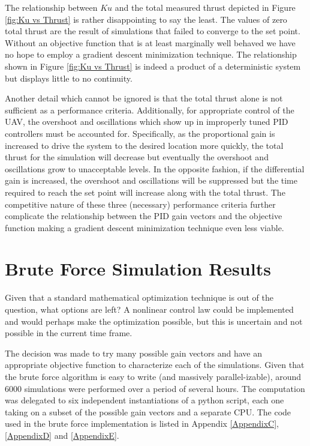 The relationship between $Ku$ and the total measured thrust depicted in Figure \ref{fig:Ku vs Thrust} is rather disappointing to say the least. The values of zero total thrust are the result of simulations that failed to converge to the set point. Without an objective function that is at least marginally well behaved we have no hope to employ a gradient descent minimization technique. The relationship shown in Figure \ref{fig:Ku vs Thrust} is indeed a product of a deterministic system but displays little to no continuity.

Another detail which cannot be ignored is that the total thrust alone is not sufficient as a performance criteria. Additionally, for appropriate control of the UAV,  the overshoot and oscillations which show up in improperly tuned PID controllers must be accounted for. Specifically, as the proportional gain is increased to drive the system to the desired location more quickly, the total thrust for the simulation will decrease but eventually the overshoot and oscillations grow to unacceptable levels. In the opposite fashion, if the differential gain is increased, the overshoot and oscillations will be suppressed but the time required to reach the set point will increase along with the total thrust. The competitive nature of these three (necessary) performance criteria further complicate the relationship between the PID gain vectors and the objective function making a gradient descent minimization technique even less viable.

\section{Brute Force Simulation Results}

Given that a standard mathematical optimization technique is out of the question, what options are left? A nonlinear control law could be implemented and would perhaps make the optimization possible, but this is uncertain and not possible in the current time frame.

The decision was made to try many possible gain vectors and have an appropriate objective function to characterize each of the simulations. Given that  the brute force algorithm is easy to write (and massively parallel-izable), around 6000 simulations were performed over a period of several hours. The computation was delegated to six independent instantiations of a python script, each one taking on a subset of the possible gain vectors and a separate CPU. The code used in the brute force implementation is listed in Appendix \ref{AppendixC}, \ref{AppendixD} and \ref{AppendixE}.

